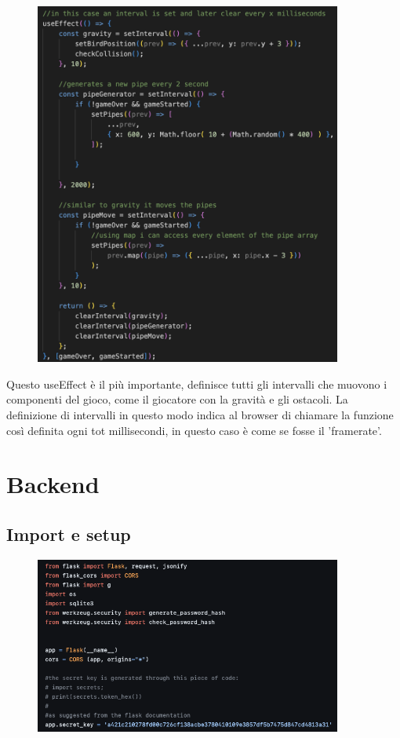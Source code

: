 \documentclass{article}
\begin{document}
\begin{figure}[H]
    \centering
    \includegraphics[width=0.9\textwidth]{images/useEffect.png}
\end{figure}

Questo useEffect è il più importante, definisce tutti gli intervalli che muovono i componenti del gioco, come il giocatore con la gravità e gli ostacoli. La definizione di intervalli in questo modo
indica al browser di chiamare la funzione così definita ogni tot millisecondi, in questo caso è come se fosse il 'framerate'.


\section{Backend}

\subsection{Import e setup}

\begin{figure}[H]
    \centering
    \includegraphics[width=0.9\textwidth]{images/import.png}
\end{figure}
\end{document}
